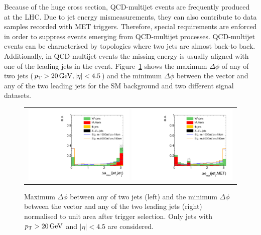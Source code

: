 Because of the huge cross section, QCD-multijet events are frequently produced at the LHC.
Due to jet energy mismeasurements, they can also contribute to data samples recorded with MET triggers.
Therefore, special requirements are enforced in order to suppress events emerging from QCD-multijet processes.
QCD-multijet events can be characterised by topologies where two jets are almost back-to back.
Additionally, in QCD-multijet events the missing energy is usually aligned with one of the leading jets in the event.
Figure~\ref{fig:QCDcuts} shows the maximum $\Delta\phi$ of any of two jets ($p_{\text{T}}>20\,\text{Ge}\kern-0.06667em\text{V}, |\eta|<4.5$) and the minimum $\Delta\phi$ between the \met vector and any of the two leading jets for the SM background and two different signal datasets.
\begin{figure}[!t]
  \centering 
  \begin{tabular}{c}
    \includegraphics[width=0.49\textwidth]{figures/analysis_2/AnalysisSelection/chiTrackstriggerRequirementsTrigger_2Signals_FullBkg/hDeltaPhiMaxbeforeCut_lin.pdf}
    \includegraphics[width=0.49\textwidth]{figures/analysis_2/AnalysisSelection/chiTrackstriggerRequirementsTrigger_2Signals_FullBkg/hDeltaPhiJetMetMinbeforeCut_lin.pdf}
  \end{tabular}
  \caption{Maximum $\Delta \phi$ between any of two jets (left) and the minimum $\Delta \phi$  between the \met vector and any of the two leading jets (right) normalised to unit area after trigger selection.
           Only jets with $p_{\text{T}}>20\,\text{Ge}\kern-0.06667em\text{V}$ and $|\eta|<4.5$ are considered.}
  \label{fig:QCDcuts}
\end{figure}

